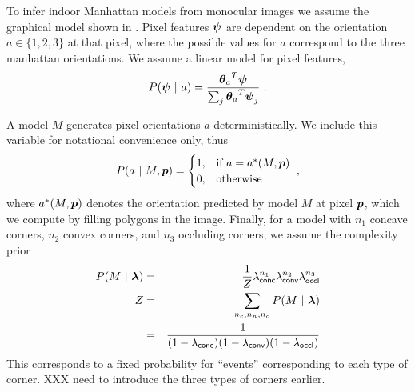 \documentclass{article}
\newcommand\Model{M}
\newcommand\Feature{\vect{\psi}}
\newcommand\Pixel{\vect{p}}
\newcommand\Orient{a}
\newcommand\Penalties{\vect{\lambda}}
\newcommand\PenaltyOccl{\lambda_\textsf{occl}}
\newcommand\PenaltyConc{\lambda_\textsf{conc}}
\newcommand\PenaltyConv{\lambda_\textsf{conv}}
\begin{document}
To infer indoor Manhattan models from monocular images we assume the
graphical model shown in . Pixel features
$\Feature$ are dependent on the orientation $\Orient\in\{1,2,3\}$ at
that pixel, where the possible values for $\Orient$ correspond to the
three manhattan orientations. We assume a linear model for pixel
features,
\begin{equation}
\label{eq:feature-likelihood}
  P(\Feature ~|~ \Orient) =
  \frac{{\vect{\theta}_\Orient}^T\Feature}
       {\sum_j{\vect{\theta}_\Orient}^T\Feature_j} ~.
\end{equation}

A model $\Model$ generates pixel orientations $\Orient$
deterministically. We include this variable for notational
convenience only, thus
\begin{equation}
  \label{eq:orient-model}
  P(\Orient ~|~ \Model,\Pixel) = 
    \begin{cases}
      1, & \mbox{if } \Orient = a^*(\Model,\Pixel) \\
      0, & \mbox{otherwise}\\
    \end{cases}
    ~,
\end{equation}
where $a^*(\Model,\Pixel)$ denotes the orientation predicted by model
$\Model$ at pixel $\Pixel$, which we compute by filling polygons in
the image. Finally, for a model with $n_1$ concave corners, $n_2$
convex corners, and $n_3$ occluding corners, we assume the complexity
prior
\begin{eqnarray}
  \label{eq:model-prior}
  P(\Model ~|~ \Penalties) &=& \frac{1}{Z} 
    \PenaltyConc^{n_1} \PenaltyConv^{n_2} \PenaltyOccl^{n_3} \\
  Z &=& \sum_{n_c,n_n,n_o} P(\Model ~|~ \Penalties) \\
    &=& \frac{1}{(1-\PenaltyConc)(1-\PenaltyConv)(1-\PenaltyOccl)}
\end{eqnarray}
This corresponds to a fixed probability for ``events'' corresponding
to each type of corner. XXX need to introduce the three types of
corners earlier.
\end{document}

